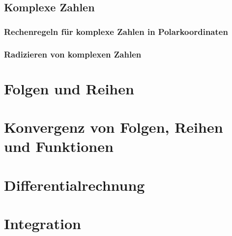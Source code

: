 \documentclass[german]{spicker}
\begin{document}
\subsection{Komplexe Zahlen}
\subsubsection{Rechenregeln für komplexe Zahlen in Polarkoordinaten}

\subsubsection{Radizieren von komplexen Zahlen}

\section{Folgen und Reihen}

\section{Konvergenz von Folgen, Reihen und Funktionen}

\section{Differentialrechnung}

\section{Integration}
\end{document}
